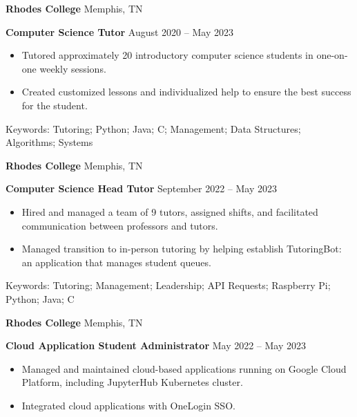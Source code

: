 \documentclass[11pt]{article}
\begin{document}
\vspace{12pt}

\textbf{Rhodes College} \hfill Memphis, TN

\textbf{Computer Science Tutor} \hfill August 2020 – May 2023
\begin{itemize}[noitemsep]
    \item Tutored approximately 20 introductory computer science students in one-on-one weekly sessions.
    \item Created customized lessons and individualized help to ensure the best success for the student.
\end{itemize}

\vspace{6pt}

Keywords: Tutoring; Python; Java; C; Management; Data Structures; Algorithms; Systems

\vspace{12pt}

\textbf{Rhodes College} \hfill Memphis, TN

\textbf{Computer Science Head Tutor} \hfill September 2022 – May 2023
\begin{itemize}[noitemsep]
    \item Hired and managed a team of 9 tutors, assigned shifts, and facilitated communication between professors and tutors.
    \item Managed transition to in-person tutoring by helping establish TutoringBot: an application that manages student queues.
\end{itemize}

\vspace{6pt}

Keywords: Tutoring; Management; Leadership; API Requests; Raspberry Pi; Python; Java; C

\vspace{12pt}

\textbf{Rhodes College} \hfill Memphis, TN

\textbf{Cloud Application Student Administrator} \hfill May 2022 – May 2023
\begin{itemize}[noitemsep]
    \item  Managed and maintained cloud-based applications running on Google Cloud Platform, including JupyterHub Kubernetes cluster.
    \item Integrated cloud applications with OneLogin SSO.
\end{itemize}

\vspace{6pt}
\end{document}
